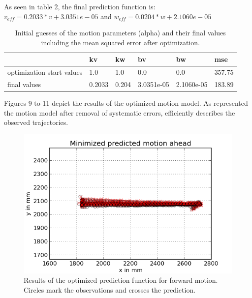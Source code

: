 \documentclass{scrartcl}
\begin{document}
As seen in table 2, the final prediction function is:\\
$v_{eff}=0.2033 * v + 3.0351e-05$ and $w_{eff} = 0.0204*w + 2.1060e-05$
 

\begin{table}[h]
\begin{tabular}{|l|l|l|l|l||l|}
\hline
                          & kv             & kw             & bv                & bw & mse            \\ \hline
optimization start values & 1.0 & 1.0 & 0.0 &  0.0 & 357.75        \\ \hline
final values              & 0.2033 & 0.204 & 3.0351e-05 & 2.1060e-05 & 183.89\\ \hline
\end{tabular}
\caption{Initial guesses of the motion parameters (alpha) and their final values including the mean squared error after optimization.}
\label{Motion parameters}
\end{table}

Figures 9 to 11 depict the results of the optimized motion model. As represented the motion model after removal of systematic errors, efficiently describes the observed trajectories. 

\begin{figure}[H]
\centering
\begin{minipage}{.5\textwidth}
  \centering
  \includegraphics[width=1\linewidth]{img/mini_predict_ahead_1.png}
\end{minipage}%

\caption{Results of the optimized prediction function for forward motion. Circles mark the observations and crosses the prediction.}
\label{fig:prediction}
\end{figure}
\end{document}
